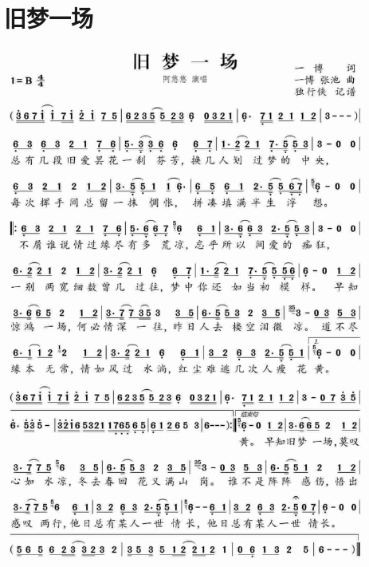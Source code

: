 \documentclass[cn,pad,twocol]{elegantbook}
\begin{document}
\section{旧梦一场} \includegraphics[width=0.9\textwidth]{macos/2020旧梦一场.jpg}
\end{document}

